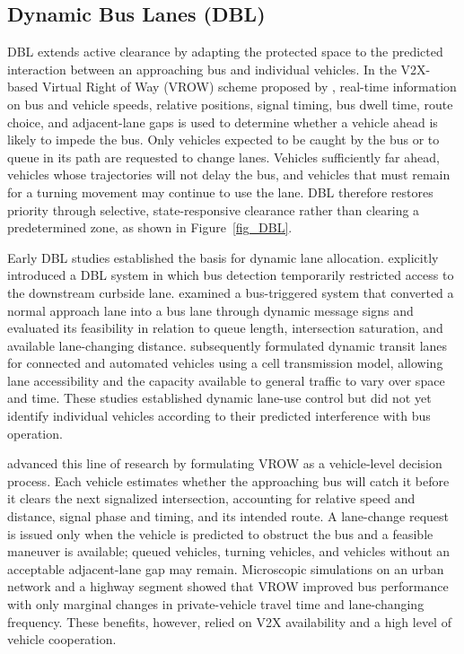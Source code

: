 \subsection{Dynamic Bus Lanes (DBL)}
\label{sec_stream_2}

DBL extends active clearance by adapting the protected space to the predicted interaction between an approaching bus and individual vehicles. In the V2X-based Virtual Right of Way (VROW) scheme proposed by \citet{xie2021design}, real-time information on bus and vehicle speeds, relative positions, signal timing, bus dwell time, route choice, and adjacent-lane gaps is used to determine whether a vehicle ahead is likely to impede the bus. Only vehicles expected to be caught by the bus or to queue in its path are requested to change lanes. Vehicles sufficiently far ahead, vehicles whose trajectories will not delay the bus, and vehicles that must remain for a turning movement may continue to use the lane. DBL therefore restores priority through selective, state-responsive clearance rather than clearing a predetermined zone, as shown in Figure~\ref{fig_DBL}.

Early DBL studies established the basis for dynamic lane allocation. \citet{yang2009innovative} explicitly introduced a DBL system in which bus detection temporarily restricted access to the downstream curbside lane. \citet{joskowicz2012dynamic} examined a bus-triggered system that converted a normal approach lane into a bus lane through dynamic message signs and evaluated its feasibility in relation to queue length, intersection saturation, and available lane-changing distance. \citet{levin2018dynamic} subsequently formulated dynamic transit lanes for connected and automated vehicles using a cell transmission model, allowing lane accessibility and the capacity available to general traffic to vary over space and time. These studies established dynamic lane-use control but did not yet identify individual vehicles according to their predicted interference with bus operation.

\citet{xie2021design} advanced this line of research by formulating VROW as a vehicle-level decision process. Each vehicle estimates whether the approaching bus will catch it before it clears the next signalized intersection, accounting for relative speed and distance, signal phase and timing, and its intended route. A lane-change request is issued only when the vehicle is predicted to obstruct the bus and a feasible maneuver is available; queued vehicles, turning vehicles, and vehicles without an acceptable adjacent-lane gap may remain. Microscopic simulations on an urban network and a highway segment showed that VROW improved bus performance with only marginal changes in private-vehicle travel time and lane-changing frequency. These benefits, however, relied on V2X availability and a high level of vehicle cooperation.

